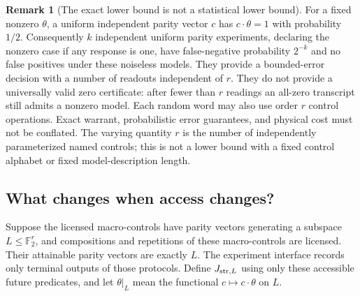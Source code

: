 \documentclass[11pt]{article}
\theoremstyle{definition}
\newtheorem{remark}[theorem]{Remark}
\begin{document}
\begin{remark}[The exact lower bound is not a statistical lower bound]
For a fixed nonzero $\theta$, a uniform independent parity vector $c$ has
$c\cdot\theta=1$ with probability $1/2$. Consequently $k$ independent
uniform parity experiments, declaring the nonzero case if any response is
one, have false-negative probability $2^{-k}$ and no false positives under
these noiseless models. They provide a bounded-error decision with a
number of readouts independent of $r$. They do not provide a universally
valid zero certificate: after fewer than $r$ readings an all-zero transcript
still admits a nonzero model. Each random word may also use order $r$
control operations. Exact warrant, probabilistic error guarantees, and
physical cost must not be conflated. The varying quantity $r$ is the number
of independently parameterized named controls; this is not a lower bound
with a fixed control alphabet or fixed model-description length.
\end{remark}

\subsection{What changes when access changes?}
\label{subsec:er-access}

Suppose the licensed macro-controls have parity vectors generating a
subspace $L\le\mathbb F_2^r$, and compositions and repetitions of these
macro-controls are licensed. Their attainable parity vectors are exactly
$L$. The experiment interface records only terminal outputs of those
protocols. Define $J_{{\rm str},L}$ using only these accessible future
predicates, and let $\theta|_L$ mean the functional
$c\mapsto c\cdot\theta$ on $L$.
\end{document}
